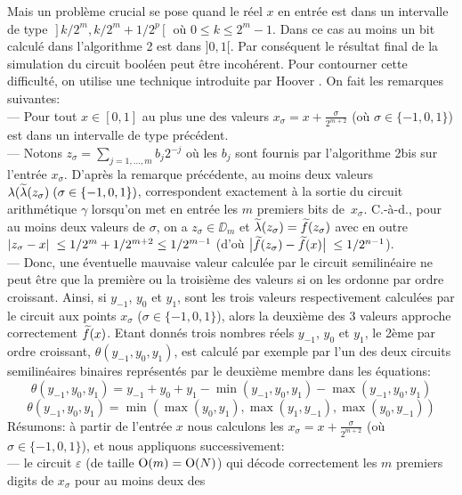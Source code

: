 \sni Mais un problème crucial se pose quand le réel $x$ en entrée est dans 
un intervalle de type  $\; ]\,k/2^m, k/2^m + 1/2^p\,[\; $   où 
$0 \leq k \leq 2^m-1$. Dans ce cas au moins un bit calculé dans l'algorithme 2 est dans $]0,1[$. Par conséquent le résultat final de la 
simulation du circuit booléen peut être incohérent. 
Pour contourner cette difficulté, on utilise une technique introduite par 
Hoover \cite{fHo87,fHo90}. On fait les remarques suivantes:\\
--- Pour tout  $x \in [0,1]$  au plus une des valeurs  
$x_{\sigma} = x + \frac \sigma   {2^{m+2}}$  (où  $ \sigma \in \{-1, 0, 1 \} $) est dans un  intervalle de type précédent.\\
--- Notons  $z_{\sigma} = \sum_{j=1,\ldots,m}b_j2^{-j}$  où les $b_j$  sont 
fournis par l'algorithme 2bis sur l'entrée  $x_{\sigma}$. D'après la remarque précédente, au moins deux valeurs  $\lambda(\widetilde {\lambda}(z_{\sigma}) \; (\sigma \in \{-1,0,1\})$, 
correspondent exactement à la sortie du circuit arithmétique  $\gamma$  
lorsqu'on met en entrée les  $m$ premiers bits de~$x_{\sigma}$. 
C.-à-d.,  pour au moins deux valeurs de  $\sigma$, on a  $z_{\sigma} \in 
\DD_m$  et $\widetilde {\lambda}(z_{\sigma}) = \widetilde{f}(z_{\sigma})$   avec en outre $\left|{ z_{\sigma} - x }\right|\;  \leq 1/2^m + 1/2^{m+2} \leq 1/2^{m-1}$ 
(d'où  $\big|{ \widetilde{f}(z_{\sigma}) - \widetilde{f}(x) }\big|\;  \leq 1/2^{n-1}$).\\
--- Donc, une éventuelle mauvaise valeur calculée par le circuit 
semilinéaire ne peut être que la première ou la troisième des valeurs si 
on les ordonne par ordre croissant.
Ainsi, si   $y_{-1}$, $y_0$ et $y_1$,  sont les trois valeurs respectivement calculées par le circuit aux points $x_{\sigma}$  ($\sigma\in  \{-1, 0,1\}$), alors la deuxième des 3 valeurs approche correctement $\widetilde{f}(x)$. 
Etant donnés trois nombres réels  $y_{-1}$, $y_0$ et $y_1$, le  2ème par 
ordre croissant, $\theta(y_{-1},y_0,y_1)$,  est calculé par exemple par l'un des deux circuits semilinéaires binaires représentés par le 
deuxième membre dans les équations:
\[
\theta (y_{-1},y_0,y_1) = y_{-1}+y_0+y_1 - \min (y_{-1},y_0,y_1) - 
\max (y_{-1},y_0,y_1)
\]
\[\theta (y_{-1},y_0,y_1) = \min (\max (y_0,y_1), \max (y_1,y_{-1}), 
\max (y_0,y_{-1}))
\]
Résumons: à partir de l'entrée $x$ nous calculons les  
$x_{\sigma} = x + \frac \sigma   {2^{m+2}}$  (où  $\sigma \in \{-1,0,1 \}$), 
et nous appliquons successivement:\\
--- le circuit $\varepsilon$ (de taille ${\rm O}(m) = {\rm O}(N)$)  qui décode 
correctement les $m$ premiers digits de $x_{\sigma}$  pour au moins deux des 
